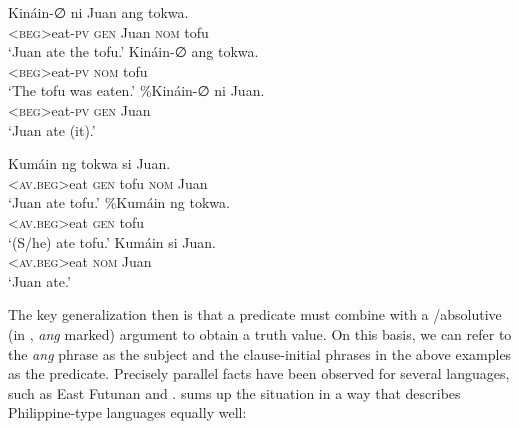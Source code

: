 \documentclass[output=paper]{langsci/langscibook}
\begin{document}
\newpage 
\begin{exe}
	\ex\label{e:kaufman:3}
	\begin{xlist}
		\ex\label{e:kaufman:3a}
        \gll K{\USSmaller}in{\USGreater}áin-∅ ni Juan ang tokwa.\\
		<\textsc{beg}>eat-\textsc{pv} \textsc{gen} Juan \textsc{nom} tofu\\
		\glt `Juan ate the tofu.'
		\ex\label{e:kaufman:3b}
        \gll K{\USSmaller}in{\USGreater}áin-∅ ang tokwa.\\
		<\textsc{beg}>eat-\textsc{pv} \textsc{nom} tofu\\
		\glt `The tofu was eaten.'
		\ex\label{e:kaufman:3c}
        \gll \%K{\USSmaller}in{\USGreater}áin-∅ ni Juan.\\
		<\textsc{beg}>eat-\textsc{pv} \textsc{gen} Juan\\
		\glt `Juan ate (it).'
	\end{xlist}
\end{exe}

\begin{exe}
	\ex\label{e:kaufman:4}
	\begin{xlist}
		\exi{\textsc{Tagalog}}
		\ex\label{e:kaufman:4a}
        \gll K{\USSmaller}um{\USGreater}áin ng tokwa si Juan.\\
		<\textsc{av.beg}>eat \textsc{gen} tofu \textsc{nom} Juan\\
		\glt `Juan ate tofu.'
		\ex\label{e:kaufman:4b}
        \gll \%K{\USSmaller}um{\USGreater}áin ng tokwa.\\
		<\textsc{av.beg}>eat \textsc{gen} tofu\\
		\glt `(S/he) ate tofu.'
		\ex\label{e:kaufman:4c}
        \gll K{\USSmaller}um{\USGreater}áin si Juan.\\
		<\textsc{av.beg}>eat \textsc{nom} Juan\\
		\glt `Juan ate.'
	\end{xlist}
\end{exe}

\noindent
The key generalization then is that a predicate must combine with a /absolutive (in , \textit{ang} marked) argument to obtain a truth value. On this basis, we can refer to the \textit{ang} phrase as the subject and the clause-initial phrases in the above examples as the predicate. Precisely parallel facts have been observed for several  languages, such as East Futunan and  \citep{Dukes:1998, Tchekhoff:1981, Biggs:1974}. \citet{Dukes:1998} sums up the  situation in a way that describes Philippine-type languages equally well:
\end{document}
